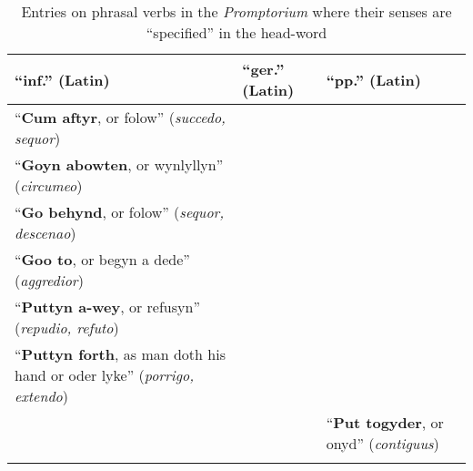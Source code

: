 \documentclass[output=paper,colorlinks,citecolor=brown,arabicfont,chinesefont]{langscibook}
\begin{document}
\begin{table}
\caption {Entries on phrasal verbs in the \textit{Promptorium} where their senses are “specified” in the head-word}
\label{tab:miyoshi:table6}
\begin{tabularx}{\linewidth}{QQQ}
\lsptoprule
\textbf{“inf.” (Latin)} &\textbf{“ger.” (Latin)} & \textbf{“pp.” (Latin)} \\
\midrule
“\textbf{Cum aftyr}, or folow” (\emph{succedo, sequor}) & &  \\
\tablevspace
“\textbf{Goyn abowten}, or wynlyllyn” (\emph{circumeo}) & &  \\
\tablevspace
“\textbf{Go behynd}, or folow” (\emph{sequor, descenao}) & &  \\
\tablevspace
“\textbf{Goo to}, or begyn a dede” (\emph{aggredior}) & &  \\
\tablevspace
“\textbf{Puttyn a-wey}, or refusyn” (\emph{repudio, refuto}) &  &  \\
\tablevspace
“\textbf{Puttyn forth}, as man doth his hand or oder lyke” (\emph{porrigo, extendo}) & & \\
 &  & “\textbf{Put togyder}, or onyd” (\emph{contiguus}) \\
\lspbottomrule
\end{tabularx}
\end{table}
\end{document}
